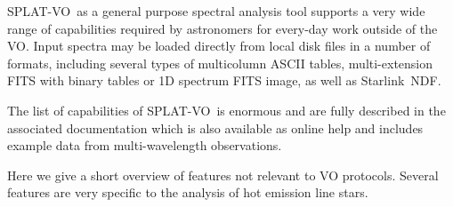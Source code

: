 \documentclass[final,authoryear,5p,times,twocolumn]{elsarticle}
\newcommand{\splatvo}{{\textsf{\small{SPLAT-VO}}}}
\newcommand{\Starlink}{\textsf{\small Starlink}}
\begin{document}
\splatvo\ as a general purpose spectral analysis tool supports a very wide
range of capabilities required by astronomers for every-day work outside of the
VO. Input spectra may be loaded directly from local disk files in a number of
formats, including several types of multicolumn ASCII tables, multi-extension
FITS with binary tables or 1D spectrum FITS image, as well as \Starlink\ NDF.

The list of capabilities of \splatvo\ is enormous and are fully described in
the associated documentation \citep[SUN/243;][]{sun243} which is also available
as online help and includes example data from multi-wavelength observations.

Here we give a short overview of features not relevant to VO protocols.
Several features are very specific to the analysis of hot emission line stars.
\end{document}
